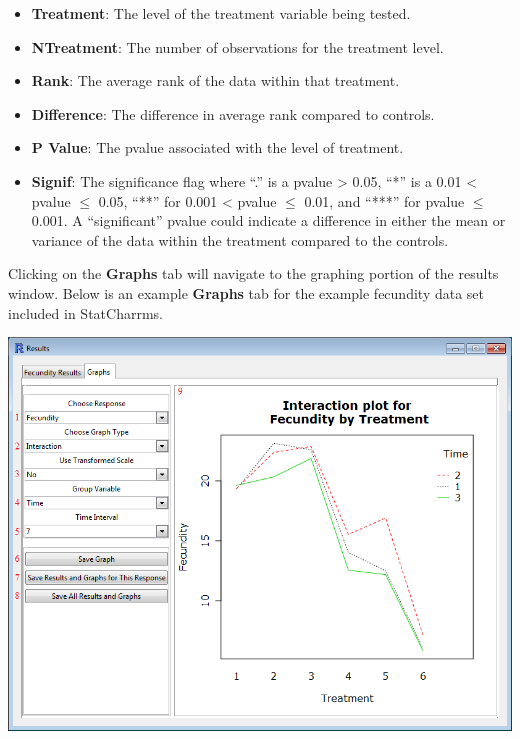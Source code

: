 \documentclass[a4paper]{article}
\begin{document}
\begin{enumerate}
\begin{itemize}
\begin{itemize}
					\item \textbf{Treatment}: The level of the treatment variable being tested.
					\item \textbf{NTreatment}:  The number of observations for the treatment level.
					\item \textbf{Rank}: The average rank of the data within that treatment.
					\item \textbf{Difference}: The difference in average rank compared to controls.
					\item \textbf{P Value}: The p\textendash{}value associated with the level of treatment.
					\item \textbf{Signif}:	The significance flag where ``.'' is a p\textendash{}value > 0.05, ``*'' is
						a 0.01 < p\textendash{}value $\leq$  0.05, ``**'' for 0.001 < p\textendash{}value $\leq$  0.01, and ``***'' for p\textendash{}value $\leq$  0.001.
						A ``significant'' p\textendash{}value could indicate a difference in either the mean or variance of the data within the treatment 
						compared to the controls. 
			\end{itemize}		
		
		
		\end{itemize}
\end{enumerate}		



Clicking on the \textbf{Graphs} tab will navigate to the graphing portion of the results window. 
Below is an example \textbf{Graphs} tab for the example fecundity data set included in StatCharrms.  	
	
 
	\begin{center}
	\hypertarget{Sec:GraphTab}{\includegraphics[width=\textwidth,keepaspectratio]{StandardAnl7.png}}
	\end{center} 
\end{document}
